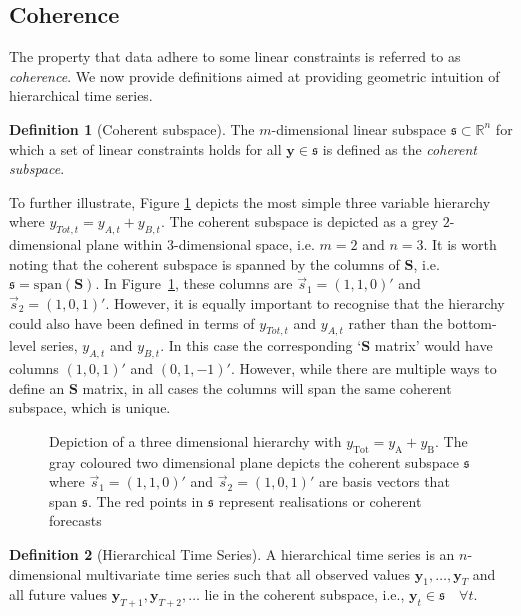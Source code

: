 \documentclass[12pt]{article}
\theoremstyle{definition}
\newtheorem{definition}{Definition}[section]
\begin{document}
	\subsection{Coherence}\label{sec:cohpointf}
	
	The property that data adhere to some linear constraints is referred to as {\em coherence}.  We now provide definitions aimed at providing geometric intuition of hierarchical time series.
	
	 \begin{definition}[Coherent subspace]\label{def:cohspace}
	 	The $m$-dimensional linear subspace $\mathfrak{s}\subset \mathbb{R}^n$ for which a set of linear constraints holds for all $\bm{y}\in\mathfrak{s}$ is defined as the \emph{coherent subspace}.
	 \end{definition}
     To further illustrate, Figure \ref{fig:3D_hierarchy} depicts the most simple three variable hierarchy where $y_{Tot,t}=y_{A,t}+y_{B,t}$.  The coherent subspace is depicted as a grey $2$-dimensional plane within $3$-dimensional space, i.e. $m=2$ and $n=3$.  It is worth noting that the coherent subspace is spanned by the columns of $\bm{S}$, i.e.\ $\mathfrak{s}=\text{span}(\bm{S})$.  In Figure~\ref{fig:3D_hierarchy}, these columns are $\vec{s}_1=(1,1,0)'$ and $\vec{s}_2=(1,0,1)'$.  However, it is equally important to recognise that the hierarchy could also have been defined in terms of $y_{Tot,t}$ and $y_{A,t}$ rather than the bottom-level series, $y_{A,t}$ and $y_{B,t}$. In this case the corresponding `$\bm{S}$ matrix' would have columns $(1,0,1)'$ and $(0,1,-1)'$.  However, while there are multiple ways to define an $\bm{S}$ matrix, in all cases the columns will span the same coherent subspace, which is unique.

     \begin{figure}[H]
     	\centering
     	\vspace{-0.9cm}
     	\small
     	\resizebox{0.8\linewidth}{!}{
     		
     	}
     	\caption{Depiction of a three dimensional hierarchy with $y_{\text{Tot}} = y_{\text{A}} + y_{\text{B}}$. The gray coloured two dimensional plane depicts the coherent subspace $\mathfrak{s}$ where $\vec{s}_1 = (1,1,0)'$ and $\vec{s}_2 = (1, 0, 1)'$ are basis vectors that span $\mathfrak{s}$. The red points in $\mathfrak{s}$ represent realisations or coherent forecasts}\label{fig:3D_hierarchy}
     \end{figure}

	 \begin{definition}[Hierarchical Time Series]\label{def:cohspace}
	 	A hierarchical time series is an $n$-dimensional multivariate time series such that all observed values $\bm{y}_1,\ldots,\bm{y}_T$ and all future values $\bm{y}_{T+1},\bm{y}_{T+2},\ldots$  lie in the coherent subspace, i.e., $\bm{y}_t\in\mathfrak{s}\quad\forall t$.
	 \end{definition}
\end{document}
